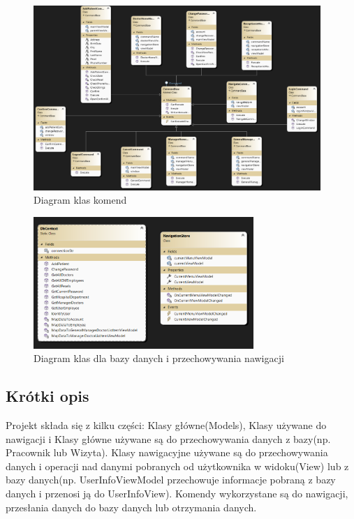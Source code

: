 \begin{flushleft}
    \begin{figure}[H]
    \begin{center}
	\includegraphics[height=7cm]{images/diag_kl_kom.png}
        \caption{Diagram klas komend}
        \label{fig:diag_kl_kom}
    \end{center}
    \end{figure}

    \begin{figure}[H]
    \begin{center}
	\includegraphics[height=5cm]{images/diag_kl_db_nav.png}
        \caption{Diagram klas dla bazy danych i przechowywania nawigacji}
        \label{fig:diag_kl_kom}
    \end{center}
    \end{figure}
    \subsection{\Large{Krótki opis}}
    \hspace{5mm} Projekt składa się z kilku części: Klasy główne(Models), Klasy używane do nawigacji i 
    Klasy główne używane są do przechowywania danych z bazy(np. Pracownik lub Wizyta). Klasy nawigacyjne używane są do przechowywania danych i operacji nad danymi pobranych od użytkownika w widoku(View) lub z bazy danych(np. UserInfoViewModel przechowuje informacje pobraną z bazy danych i przenosi ją do UserInfoView).
    Komendy wykorzystane są do nawigacji, przesłania danych do bazy danych lub otrzymania danych.
\end{flushleft}